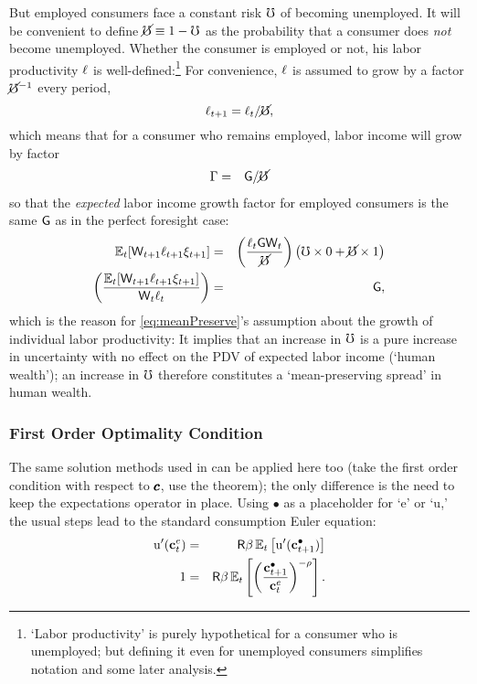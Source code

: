 \message{ !name(TractableBufferStock.tex)}\documentclass{handout}
\begin{document}
But employed consumers face a constant risk $\mho$ of becoming unemployed.  
It will be convenient to define $\cancel{\mho}\equiv 1-\mho$ as the probability that a consumer does {\it not} become unemployed.  Whether the consumer is employed or not, his labor productivity $\ell$ is well-defined:\footnote{`Labor productivity' is purely hypothetical for a consumer who is unemployed; but defining it even for unemployed consumers simplifies notation and some later analysis.}  For convenience, $\ell$ is assumed to grow by a factor $\cancel{\mho}^{-1}$ every period,
\begin{equation}
\ell_{t+1} =    \ell_{t}/\cancel{\mho} \label{eq:meanPreserve},
\end{equation}
which means that for a consumer who remains employed, labor income will grow by factor
\begin{eqnarray}
  \Gamma & = & \mathsf{G}/\cancel{\mho}
\end{eqnarray}
so that the {\it expected} labor income growth factor for
employed consumers is the same $\mathsf{G}$ as in the perfect foresight case:
\begin{eqnarray*}
  \operatorname{\mathbb{E}}_{t}[\mathsf{W}_{t+1}\ell_{t+1}\xi_{t+1}] & = &  \left(\frac{\ell_{t} \mathsf{G} \mathsf{W}_{t}}{\cancel{\mho}}\right)\left(\mho \times 0 + \cancel{\mho} \times 1 \right)
\\ \left(\frac{\operatorname{\mathbb{E}}_{t}[\mathsf{W}_{t+1}\ell_{t+1}\xi_{t+1}]}{\mathsf{W}_{t} \ell_{t}}\right) &  = & \mathsf{G}
,
\end{eqnarray*}
which is  the reason for \eqref{eq:meanPreserve}'s assumption about the growth of
individual labor productivity: It implies
that an increase in $\mho$ is a pure increase in uncertainty with no
effect on the PDV of expected labor income (`human wealth'); an increase in $\mho$ therefore constitutes a `mean-preserving spread' in human wealth.

\subsubsection{First Order Optimality Condition}

The same solution methods used in  can 
be applied here too (take the first order condition with respect to $\pmb{c}$, use
the  theorem); the only difference is the need to keep the expectations operator
in place.  Using $\bullet$ as a placeholder for `e' or `u,' the
usual steps lead to the standard consumption Euler equation:
\begin{eqnarray}
        {\ensuremath{\mathrm{u}}}^{\prime}(\mathbf{c}^{e}_{t}) & = & \mathsf{R}\beta \operatorname{\mathbb{E}}_{t}\left[{\mathrm{u}}^{\prime}(\mathbf{c}^{\bullet}_{t+1}) \right]
\\  1         & = & \mathsf{R}\beta \operatorname{\mathbb{E}}_{t}\left[\left(\frac{\mathbf{c}^{\bullet}_{t+1}}{\mathbf{c}^{e}_{t}}\right)^{-\rho} \right]
.
\end{eqnarray}
\end{document}
